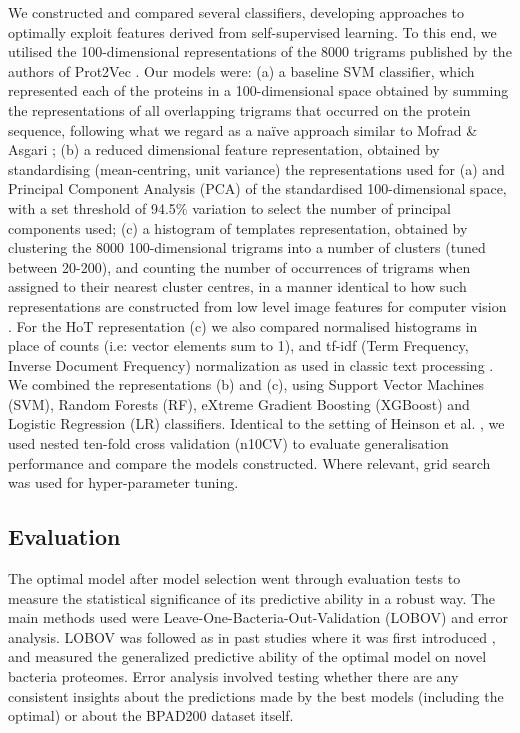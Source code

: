 \documentclass[10pt,journal,compsoc,twoside]{IEEEtran}
\begin{document}
We constructed and compared several classifiers, developing approaches to optimally exploit features derived from self-supervised learning. To this end, we utilised the 100-dimensional representations of the 8000 trigrams published by the authors of Prot2Vec \cite{protvec}. Our models were: (a) a baseline SVM classifier, which represented each of the proteins in a 100-dimensional space obtained by summing the representations of all overlapping trigrams that occurred on the protein sequence, following what we regard as a naïve approach similar to Mofrad & Asgari \cite{protvec}; (b) a reduced dimensional feature representation, obtained by standardising (mean-centring, unit variance) the representations used for (a) and Principal Component Analysis (PCA) of the standardised 100-dimensional space, with a set threshold of 94.5\% variation to select the number of principal components used; (c) a histogram of templates representation, obtained by clustering the 8000 100-dimensional trigrams into a number of clusters (tuned between 20-200), and counting the number of occurrences of trigrams when assigned to their nearest cluster centres, in a manner identical to how such representations are constructed from low level image features for computer vision \cite{bovw-computer-vision}. For the HoT representation (c) we also compared normalised histograms in place of counts (i.e: vector elements sum to 1), and tf-idf (Term Frequency, Inverse Document Frequency) normalization as used in classic text processing \cite{tf-idf}. We combined the representations (b) and (c), using Support Vector Machines (SVM), Random Forests (RF), eXtreme Gradient Boosting (XGBoost) and Logistic Regression (LR) classifiers. Identical to the setting of Heinson et al. \cite{heinson_2017}, we used nested ten-fold cross validation (n10CV) to evaluate generalisation performance and compare the models constructed. Where relevant, grid search was used for hyper-parameter tuning. 


\subsection{Evaluation}
\label{sec:methods3}

The optimal model after model selection went through evaluation tests to measure the statistical significance of its predictive ability in a robust way. The main methods used were Leave-One-Bacteria-Out-Validation (LOBOV) and error analysis. LOBOV was followed as in past studies where it was first introduced \cite{heinson_2019}, and measured the generalized predictive ability of the optimal model on novel bacteria proteomes. Error analysis involved testing whether there are any consistent insights about the predictions made by the best models (including the optimal) or about the BPAD200 dataset itself.
\end{document}

